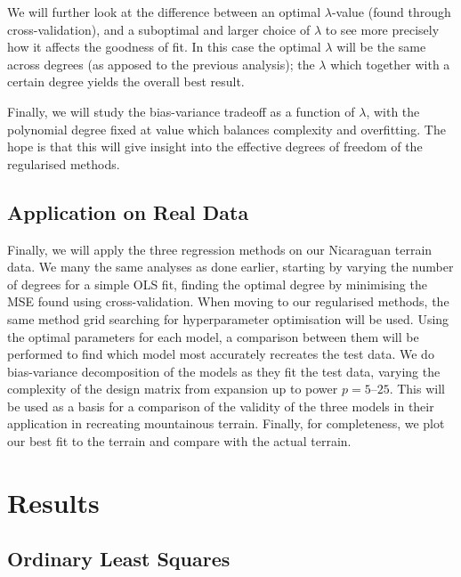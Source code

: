 \documentclass[twocolumn,english,notitlepage]{article}
\begin{document}
        We will further look at the difference between an optimal $\lambda$-value (found through cross-validation), and a suboptimal and larger choice of $\lambda$ to see more precisely how it affects the goodness of fit. In this case the optimal $\lambda$ will be the same across degrees (as apposed to the previous analysis); the $\lambda$ which together with a certain degree yields the overall best result.

        Finally, we will study the bias-variance tradeoff as a function of $\lambda$, with the polynomial degree fixed at value which balances complexity and overfitting. The hope is that this will give insight into the effective degrees of freedom of the regularised methods.

    \subsection{Application on Real Data}
        Finally, we will apply the three regression methods on our Nicaraguan terrain data. We many the same analyses as done earlier, starting by varying the number of degrees for a simple OLS fit, finding the optimal degree by minimising the MSE found using cross-validation.
        When moving to our regularised methods, the same method grid searching for hyperparameter optimisation will be used. Using the optimal parameters for each model, a comparison between them will be performed to find which model most accurately recreates the test data. We do bias-variance decomposition of the models as they fit the test data, varying the complexity of the design matrix from expansion up to power $p=5\text{--}25$. This will be used as a basis for a comparison of the validity of the three models in their application in recreating mountainous terrain. Finally, for completeness, we plot our best fit to the terrain and compare with the actual terrain.


\section{Results}
    \subsection{Ordinary Least Squares}
\end{document}

